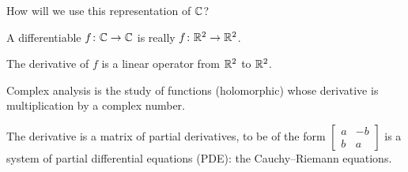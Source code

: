 \documentclass[10pt,aspectratio=169]{beamer}
\begin{document}
\begin{frame}

How will we use this representation of ${\mathbb{C}}$?

\medskip
\pause

A differentiable
$f \colon {\mathbb{C}} \to {\mathbb{C}}$ is really
$f \colon {\mathbb{R}}^2 \to {\mathbb{R}}^2$.

\medskip
\pause

The derivative of $f$ is a linear operator from ${\mathbb{R}}^2$ to ${\mathbb{R}}^2$.

\medskip
\pause

Complex analysis is the study of functions (holomorphic) whose
derivative is multiplication by a complex number.

\medskip
\pause

The derivative is a matrix of partial derivatives, to be of the form
$\left[
\begin{smallmatrix}
a & -b \\
b & a
\end{smallmatrix}
\right]$ is a system of partial differential equations (PDE):
the Cauchy--Riemann equations.
\end{frame}
\end{document}
